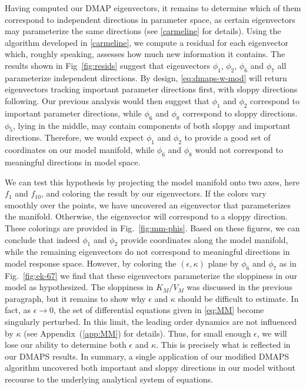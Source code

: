 Having computed our DMAP eigenvectors, it remains to determine which
of them correspond to independent directions in parameter space, as
certain eigenvectors may parameterize the same directions (see
\ref{carmeline} for details). Using the algorithm developed in
\ref{carmeline}, we compute a residual for each eigenvector which,
roughly speaking, assesses how much new information it contains. The
results shown in Fig~\ref{fig:resids} suggest that eigenvectors
$\phi_1$, $\phi_2$, $\phi_6$ and $\phi_7$ all parameterize independent
directions. By design, \eqref{eq:dmaps-w-mod} will return eigenvectors
tracking important parameter directions first, with sloppy directions
following. Our previous analysis would then suggest that $\phi_1$ and
$\phi_2$ correspond to important parameter directions, while $\phi_6$
and $\phi_8$ correspond to sloppy directions. $\phi_5$, lying in the
middle, may contain components of both sloppy and  important
directions. Therefore, we would expect $\phi_1$ and $\phi_2$ to
provide a good set of coordinates on our model manifold, while
$\phi_6$ and $\phi_8$ would not correspond to meaningful directions in
model space.

We can test this hypothesis by projecting the model manifold onto two
axes, here $f_1$ and $f_{10}$, and coloring the result by our
eigenvectors. If the colors vary smoothly over the points, we have
uncovered an eigenvector that parameterizes the manifold. Otherwise,
the eigenvector will correspond to a sloppy direction. These colorings
are provided in Fig.~\ref{fig:mm-phis}. Based on these figures, we can
conclude that indeed $\phi_1$ and $\phi_2$ provide coordinates along
the model manifold, while the remaining eigenvectors do not correspond
to meaningful directions in model response space. However, by coloring
the $(\epsilon, \kappa)$ plane by $\phi_6$ and $\phi_7$ as in
Fig.~\ref{fig:ek-67} we find that these eigenvectors parameterize the
sloppiness in our model as hypothesized. The sloppiness in $K_M/V_M$
was discussed in the previous paragraph, but it remains to show why
$\epsilon$ and $\kappa$ should be difficult to estimate. In fact, as
$\epsilon \rightarrow 0$, the set of differential equations given in
\eqref{eq:MM} become singularly perturbed. In this limit, the leading
order dynamics are not influenced by $\kappa$ (see
Appendix~(\ref{app:MM}) for details). Thus, for small enough
$\epsilon$, we will lose our ability to determine both $\epsilon$ and
$\kappa$. This is precisely what is reflected in our DMAPS results. In
summary, a single application of our modified DMAPS algorithm
uncovered both important and sloppy directions in our model without
recourse to the underlying analytical system of equations.

